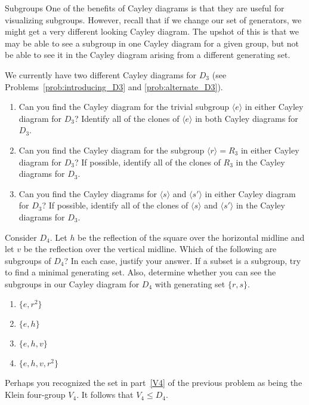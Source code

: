\begin{section}{Subgroups}
One of the benefits of Cayley diagrams is that they are useful for visualizing subgroups.  However, recall that if we change our set of generators, we might get a very different looking Cayley diagram.  The upshot of this is that we may be able to see a subgroup in one Cayley diagram for a given group, but not be able to see it in the Cayley diagram arising from a different generating set.

\begin{problem}
We currently have two different Cayley diagrams for $D_3$ (see Problems~\ref{prob:introducing_D3} and \ref{prob:alternate_D3}).  
\begin{enumerate}[label=\rm{(\alph*)}]
\item Can you find the Cayley diagram for the trivial subgroup $\langle e\rangle$ in either Cayley diagram for $D_3$?  Identify all of the clones of $\langle e\rangle$ in both Cayley diagrams for $D_3$.
\item Can you find the Cayley diagram for the subgroup $\langle r\rangle =R_3$ in either Cayley diagram for $D_3$?  If possible, identify all of the clones of $R_3$ in the Cayley diagrams for $D_3$.
\item Can you find the Cayley diagrams for $\langle s\rangle$ and $\langle s'\rangle$ in either Cayley diagram for $D_3$?  If possible, identify all of the clones of $\langle s\rangle$ and $\langle s'\rangle$ in the Cayley diagrams for $D_3$.
\end{enumerate}
\end{problem}

\begin{problem}\label{prob:subgroups_D4}
Consider $D_4$.  Let $h$ be the reflection of the square over the horizontal midline and let $v$ be the reflection over the vertical midline.  Which of the following are subgroups of $D_4$?  In each case, justify your answer.  If a subset is a subgroup, try to find a minimal generating set.  Also, determine whether you can see the subgroups in our Cayley diagram for $D_4$ with generating set $\{r,s\}$.
\begin{enumerate}[label=\rm{(\alph*)}]
\item $\{e, r^2\}$
\item $\{e,h\}$
\item $\{e, h, v\}$
\item\label{V4} $\{e, h, v, r^2\}$
\end{enumerate}
\end{problem}

Perhaps you recognized the set in part~\ref{V4} of the previous problem as being the Klein four-group $V_4$. It follows that $V_4\leq D_4$.


\end{section}
